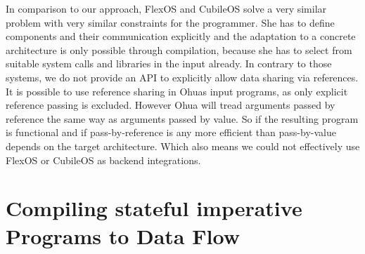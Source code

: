 In comparison to our approach, FlexOS and CubileOS solve a very similar problem with very similar constraints for the programmer. She has to define components and their communication explicitly and the adaptation to a concrete architecture is only possible through compilation, because she has to select from suitable system calls and libraries in the input already. In contrary to those systems, we do not provide an API to explicitly allow data sharing via references. It is possible to use reference sharing in Ohuas input programs, as only explicit reference passing is excluded. However Ohua will tread arguments passed by reference the same way as arguments passed by value. So if the resulting program is functional and if pass-by-reference is any more efficient than pass-by-value depends on the target architecture. Which also means we could not effectively use FlexOS or CubileOS as backend integrations.


\section{Compiling stateful imperative Programs to Data Flow}


